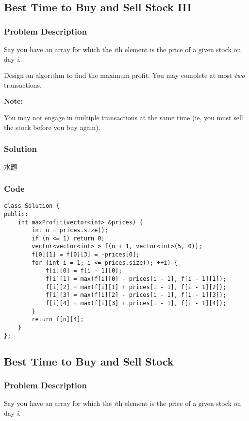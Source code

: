 \documentclass[courier]{article}
\begin{document}
\begin{CJK*}{UTF8}{gkai}
\subsection{ Best Time to Buy and Sell Stock III }

\subsubsection*{Problem Description}
Say you have an array for which the \emph{i}th element is the price of a given stock on day \emph{i}.

Design an algorithm to find the maximum profit. You may complete at most \emph{two} transactions.

\textbf{Note:}


You may not engage in multiple transactions at the same time (ie, you must sell the stock before you buy again).



\subsubsection*{Solution}
水题

\subsubsection*{Code}
\begin{lstlisting}
class Solution {
public:
    int maxProfit(vector<int> &prices) {
        int n = prices.size();
        if (n <= 1) return 0;
        vector<vector<int> > f(n + 1, vector<int>(5, 0));
        f[0][1] = f[0][3] = -prices[0];
        for (int i = 1; i <= prices.size(); ++i) {
            f[i][0] = f[i - 1][0];
            f[i][1] = max(f[i][0] - prices[i - 1], f[i - 1][1]);
            f[i][2] = max(f[i][1] + prices[i - 1], f[i - 1][2]);
            f[i][3] = max(f[i][2] - prices[i - 1], f[i - 1][3]);
            f[i][4] = max(f[i][3] + prices[i - 1], f[i - 1][4]);
        }
        return f[n][4];
    }
};

\end{lstlisting}


\subsection{ Best Time to Buy and Sell Stock }

\subsubsection*{Problem Description}
Say you have an array for which the \emph{i}th element is the price of a given stock on day \emph{i}.


\end{CJK*}
\end{document}
